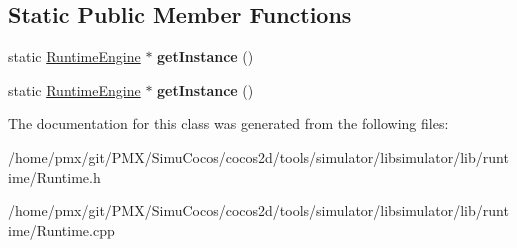 \subsection*{Static Public Member Functions}
\begin{DoxyCompactItemize}
\item 
\mbox{\label{classRuntimeEngine_afaf60083e8427b93778a336fe35395b8}} 
static \hyperlink{classRuntimeEngine}{Runtime\+Engine} $\ast$ {\bfseries get\+Instance} ()
\item 
\mbox{\label{classRuntimeEngine_abfd1c3ac3bd2af3ccf026904bdef4599}} 
static \hyperlink{classRuntimeEngine}{Runtime\+Engine} $\ast$ {\bfseries get\+Instance} ()
\end{DoxyCompactItemize}


The documentation for this class was generated from the following files\+:\begin{DoxyCompactItemize}
\item 
/home/pmx/git/\+P\+M\+X/\+Simu\+Cocos/cocos2d/tools/simulator/libsimulator/lib/runtime/Runtime.\+h\item 
/home/pmx/git/\+P\+M\+X/\+Simu\+Cocos/cocos2d/tools/simulator/libsimulator/lib/runtime/Runtime.\+cpp\end{DoxyCompactItemize}

